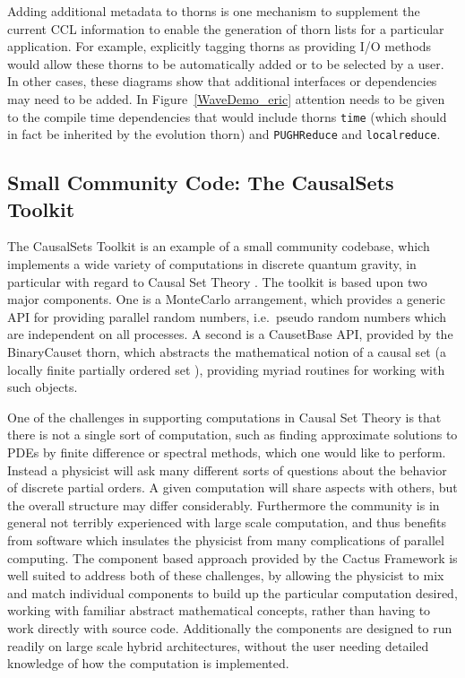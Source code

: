 \documentclass[conference]{IEEEtran}
\begin{document}
Adding additional metadata to thorns is one mechanism to supplement the current CCL information to enable the generation of thorn lists for a particular 
application. For example, explicitly tagging thorns as providing I/O methods would allow these
thorns to be automatically added or to be selected by a user. In other cases, these diagrams show 
that additional interfaces or dependencies may need to be added. In Figure~\ref{WaveDemo_eric} 
attention needs to be given to the compile time dependencies that would include thorns {\tt time} 
(which should in fact be inherited by the evolution thorn) and {\tt PUGHReduce} and {\tt localreduce}. 


\subsection{Small Community Code: The CausalSets Toolkit}
\label{quantumgravity}

The CausalSets Toolkit is an example of a small community codebase, which
implements a wide variety of computations in discrete quantum gravity, in
particular with regard to Causal Set Theory \cite{causets}.
The toolkit is
based upon two major components. One is a MonteCarlo arrangement, which
provides a generic API for providing parallel random numbers, i.e.\ pseudo
random numbers which are independent on all processes.  A second is a
CausetBase API, provided by the BinaryCauset thorn, which abstracts the
mathematical notion of a causal set (a locally finite partially ordered set
\cite{causets}), providing myriad routines for working with such objects.

One of the
challenges in supporting computations in Causal Set Theory is that 
there is
not a single sort of computation, such as finding approximate solutions to
PDEs by finite difference or spectral methods, which one would like to
perform.
Instead a physicist will ask many different sorts of questions about the
behavior of discrete partial orders.  A given computation will share aspects
with others, but the overall structure may differ considerably.
Furthermore the community is in general not terribly experienced with large
scale computation, and thus benefits from software which insulates the
physicist from many
complications of parallel computing.
The component based approach provided by the Cactus Framework is well suited
to address both of these challenges, by allowing the physicist to mix and
match individual components to build up the particular computation desired,
working with familiar abstract mathematical concepts, rather than having to
work directly with source code.  Additionally the components are designed
to run readily on large scale hybrid architectures, without the user needing detailed
knowledge of how the computation is implemented.
\end{document}
